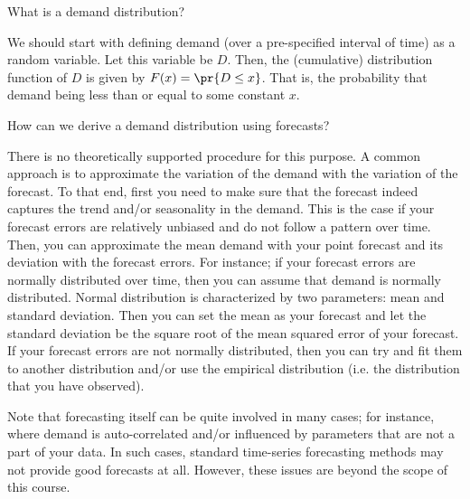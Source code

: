 \begin{exercise}
What is a demand distribution?


\begin{solution}
We should start with defining demand (over a pre-specified interval of time) as a random variable. Let this variable be $D$. Then, the (cumulative) distribution function of $D$ is given by $F(x)=\pr{D\leq x}$. That is, the probability that demand being less than or equal to some constant $x$. 
\end{solution}
\end{exercise}

\begin{exercise}
How can we derive a demand distribution using forecasts? 


\begin{solution}
There is no theoretically supported procedure for this purpose. A common approach is to approximate the variation of the demand with the variation of the forecast. To that end, first you need to make sure that the forecast indeed captures the trend and/or seasonality in the demand. This is the case if your forecast errors are relatively unbiased and do not follow a pattern over time. Then, you can approximate the mean demand with your point forecast and its deviation with the forecast errors. For instance; if your forecast errors are normally distributed over time, then you can assume that demand is normally distributed. Normal distribution is characterized by two parameters: mean and standard deviation. Then you can set the mean as your forecast and let the standard deviation be the square root of the mean squared error of your forecast. If your forecast errors are not normally distributed, then you can try and fit them to another distribution and/or use the empirical distribution (i.e. the distribution that you have observed). 

Note that forecasting itself can be quite involved in many cases; for instance, where demand is auto-correlated and/or influenced by parameters that are not a part of your data. In such cases, standard time-series forecasting methods may not provide good forecasts at all. However, these issues are beyond the scope of this course. 
\end{solution}
\end{exercise}

